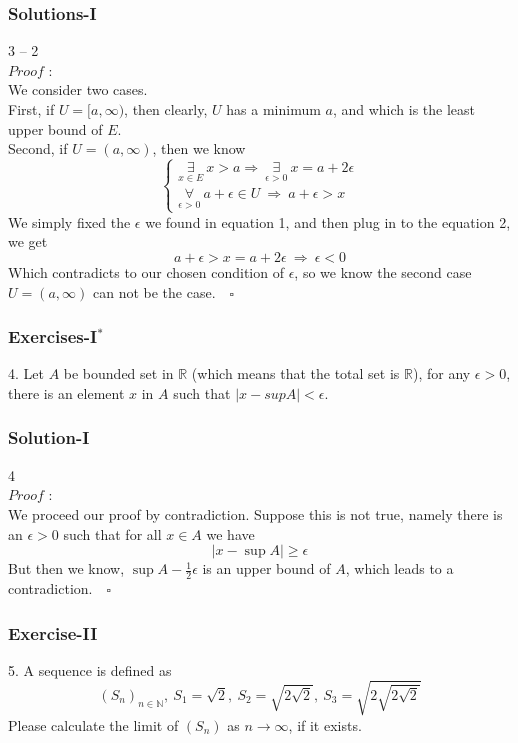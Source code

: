 \documentclass[12pt, t]{beamer}
\begin{document}
\begin{frame}
    \frametitle{Solutions-I}
3 -- 2\\
$Proof$ : \\
We consider two cases.\\
First, if $U=[a,\infty)$, then clearly, $U$ has a minimum $a$, and which is the least upper bound of $E$.\\
Second, if $U=(a,\infty)$, then we know
\begin{equation*}
    \begin{cases}
        \underset{x\in E}{\exists}\ x>a\Rightarrow\ \underset{\epsilon>0}{\exists}\ x=a+2\epsilon\\
        \underset{\epsilon>0}{\forall}\ a+\epsilon\in U\ \Rightarrow\ a+\epsilon>x
    \end{cases}
\end{equation*}
We simply fixed the $\epsilon$ we found in equation 1, and then plug in to the equation 2, we get 
\begin{equation*}
    a+\epsilon>x=a+2\epsilon\ \Rightarrow\ \epsilon<0
\end{equation*}
Which contradicts to our chosen condition of $\epsilon$, so we know the second case $U=(a,\infty)$ can not be the case.$\quad\square$

\end{frame}


\begin{frame}
    \frametitle{Exercises-I$^*$}
4. Let $A$ be bounded set in $\mathbb{R}$ (which means that the total set is $\mathbb{R}$), for any $\epsilon>0$, 
there is an element $x$ in $A$ such that $|x-supA|<\epsilon$.
\end{frame}

\begin{frame}
    \frametitle{Solution-I}
4\\
$Proof$ : \\
\hspace{1em} We proceed our proof by contradiction. Suppose this is not true, namely there is an $\epsilon>0$ such 
that for all $x\in A$ we have 
\begin{equation*}
    |x-\sup A|\geq \epsilon
\end{equation*}
But then we know, $\sup A-\frac{1}{2}\epsilon$ is an upper bound of $A$, which leads to a contradiction.$\quad\square$
\end{frame}

\begin{frame}
    \frametitle{Exercise-II}
5. A sequence is defined as
\begin{equation*}
    (S_n)_{n\in\mathbb{N}},\ S_1=\sqrt{2},\ S_2=\sqrt{2\sqrt{2}},\ S_3=\sqrt{2\sqrt{2\sqrt{2}}}
\end{equation*}
Please calculate the limit of $(S_n)$ as $n\rightarrow \infty$, if it exists.
\end{frame}
\end{document}
